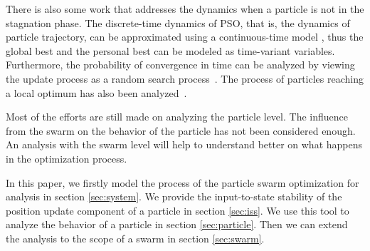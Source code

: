 There is also some work that addresses the dynamics when a particle is not in the stagnation phase.
The discrete-time dynamics of PSO, that is, the dynamics of particle trajectory, can be approximated
using a continuous-time model
\cite{5675669}, thus the global best and the personal best can be modeled as time-variant variables.
Furthermore, the probability of convergence in time can be analyzed by viewing the update process as a random search process~\cite{vandenBergh:2010:CPP:2010420.2010421}.
The process of particles reaching a local optimum has also been analyzed~\cite{Schmitt:2013:PSO:2463372.2463563}.

Most of the efforts are still made on analyzing the particle level.
The influence from the swarm on the behavior of the particle has not been considered enough.
An analysis with the swarm level will help to understand better on what happens in the optimization process.

In this paper, we firstly model the process of the particle swarm optimization for analysis in section \ref{sec:system}.
We provide the input-to-state stability of the position update component of a particle in section \ref{sec:iss}.
We use this tool to analyze the behavior of a particle in section \ref{sec:particle}.
Then we can extend the analysis to the scope of a swarm in section \ref{sec:swarm}.
